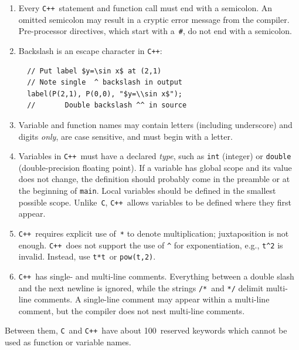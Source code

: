 \documentclass[12pt,letterpaper]{book}
\newcommand{\code}[1]{\texttt{#1}}
\newcommand{\C}{\code{C}}
\newcommand{\CXX}{\code{C++}}
\begin{document}
\begin{enumerate}
\item Every \CXX\ statement and function call must end with a
  semicolon. An omitted semicolon may result in a cryptic error
  message from the compiler. Pre-processor directives, which start
  with a~\code{\#}, do not end with a semicolon.

\item Backslash is an escape character in \CXX:
\begin{verbatim}
  // Put label $y=\sin x$ at (2,1)
  // Note single  ^ backslash in output
  label(P(2,1), P(0,0), "$y=\\sin x$"); 
  //       Double backslash ^^ in source
\end{verbatim}
  
\item Variable and function names may contain letters (including
  underscore) and digits \emph{only}, are case sensitive, and must
  begin with a letter.

\item Variables in \CXX\ must have a declared \emph{type}, such as
  \code{int} (integer) or \code{double} (double-precision floating
  point). If a variable has global scope and its value does not
  change, the definition should probably come in the preamble or at
  the beginning of \code{main}. Local variables should be defined in
  the smallest possible scope. Unlike~\C, \CXX\ allows variables to be
  defined where they first appear.
  
\item \CXX~requires explicit use of~\code{*} to denote multiplication;
  juxtaposition is not enough. \CXX~does not support the use of
  \verb+^+ for exponentiation, e.g., \verb+t^2+ is invalid. Instead,
  use \code{t*t}~or \code{pow(t,2)}.

\item \CXX\ has single- and multi-line comments. Everything between a
  double slash and the next newline is ignored, while the strings
  \verb+/*+~and \verb+*/+ delimit multi-line comments. A single-line
  comment may appear within a multi-line comment, but the compiler
  does not nest multi-line comments.

\end{enumerate}

Between them, \C~and \CXX~have about 100~reserved keywords which
cannot be used as function or variable names.
\index{Cplusplus@\CXX|)}
\end{document}
